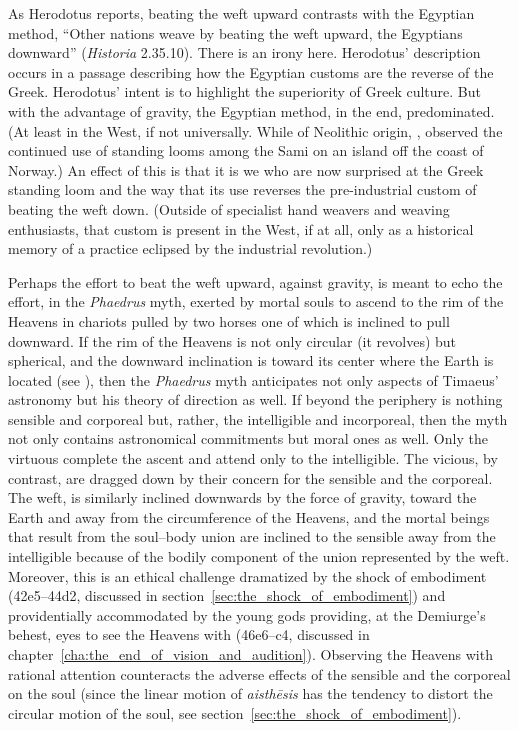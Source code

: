 As Herodotus reports, beating the weft upward contrasts with the Egyptian method, ``Other nations weave by beating the weft upward, the Egyptians downward'' (\emph{Historia} 2.35.10). There is an irony here. Herodotus' description occurs in a passage describing how the Egyptian customs are the reverse of the Greek. Herodotus' intent is to highlight the superiority of Greek culture. But with the advantage of gravity, the Egyptian method, in the end, predominated. (At least in the West, if not universally. While of Neolithic origin, \citealt[1--2]{Hoffmann:1964aa}, observed the continued use of standing looms among the Sami on an island off the coast of Norway.) An effect of this is that it is we who are now surprised at the Greek standing loom and the way that its use reverses the pre-industrial custom of beating the weft down. (Outside of specialist hand weavers and weaving enthusiasts, that custom is present in the West, if at all, only as a historical memory of a practice eclipsed by the industrial revolution.)

Perhaps the effort to beat the weft upward, against gravity, is meant to echo the effort, in the \emph{Phaedrus} myth, exerted by mortal souls to ascend to the rim of the Heavens in chariots pulled by two horses one of which is inclined to pull downward. If the rim of the Heavens is not only circular (it revolves) but spherical, and the downward inclination is toward its center where the Earth is located (see \citealt[114--5]{Dicks:1970aa}), then the \emph{Phaedrus} myth anticipates not only aspects of Timaeus' astronomy but his theory of direction as well. If beyond the periphery is nothing sensible and corporeal but, rather, the intelligible and incorporeal, then the myth not only contains astronomical commitments but moral ones as well. Only the virtuous complete the ascent and attend only to the intelligible. The vicious, by contrast, are dragged down by their concern for the sensible and the corporeal. The weft, is similarly inclined downwards by the force of gravity, toward the Earth and away from the circumference of the Heavens, and the mortal beings that result from the soul--body union are inclined to the sensible away from the intelligible because of the bodily component of the union represented by the weft. Moreover, this is an ethical challenge dramatized by the shock of embodiment (42e5--44d2, discussed in section~\ref{sec:the_shock_of_embodiment}) and providentially accommodated by the young gods providing, at the Demiurge's behest, eyes to see the Heavens with (46e6–c4, discussed in chapter~\ref{cha:the_end_of_vision_and_audition}). Observing the Heavens with rational attention counteracts the adverse effects of the sensible and the corporeal on the soul (since the linear motion of \emph{aisthēsis} has the tendency to distort the circular motion of the soul, see section~\ref{sec:the_shock_of_embodiment}).

